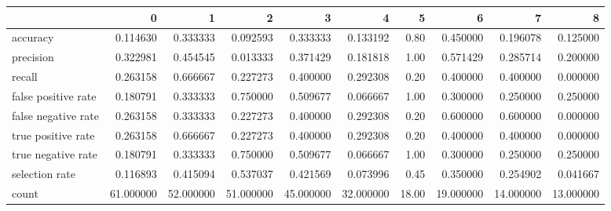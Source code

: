 \begin{tabular}{lrrrrrrrrr}
\toprule
{} &          0 &          1 &          2 &          3 &          4 &      5 &          6 &          7 &          8 \\
\midrule
accuracy            &   0.114630 &   0.333333 &   0.092593 &   0.333333 &   0.133192 &   0.80 &   0.450000 &   0.196078 &   0.125000 \\
precision           &   0.322981 &   0.454545 &   0.013333 &   0.371429 &   0.181818 &   1.00 &   0.571429 &   0.285714 &   0.200000 \\
recall              &   0.263158 &   0.666667 &   0.227273 &   0.400000 &   0.292308 &   0.20 &   0.400000 &   0.400000 &   0.000000 \\
false positive rate &   0.180791 &   0.333333 &   0.750000 &   0.509677 &   0.066667 &   1.00 &   0.300000 &   0.250000 &   0.250000 \\
false negative rate &   0.263158 &   0.333333 &   0.227273 &   0.400000 &   0.292308 &   0.20 &   0.600000 &   0.600000 &   0.000000 \\
true positive rate  &   0.263158 &   0.666667 &   0.227273 &   0.400000 &   0.292308 &   0.20 &   0.400000 &   0.400000 &   0.000000 \\
true negative rate  &   0.180791 &   0.333333 &   0.750000 &   0.509677 &   0.066667 &   1.00 &   0.300000 &   0.250000 &   0.250000 \\
selection rate      &   0.116893 &   0.415094 &   0.537037 &   0.421569 &   0.073996 &   0.45 &   0.350000 &   0.254902 &   0.041667 \\
count               &  61.000000 &  52.000000 &  51.000000 &  45.000000 &  32.000000 &  18.00 &  19.000000 &  14.000000 &  13.000000 \\
\bottomrule
\end{tabular}
